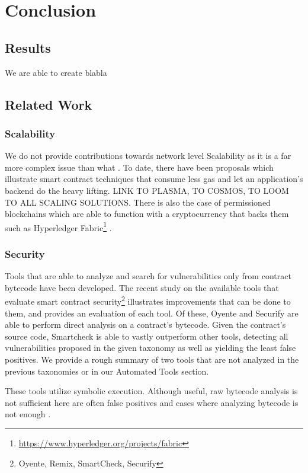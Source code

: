 \chapter{Conclusion}
\section{Results}
We are able to create blabla

\section{Related Work}

\subsection{Scalability}
We do not provide contributions towards network level Scalability as it is a far more complex issue than what . To date, there have been proposals \cite{stateless} which illustrate smart contract techniques that consume less gas and let an application's backend do the heavy lifting. LINK TO PLASMA, TO COSMOS, TO LOOM TO ALL SCALING SOLUTIONS. There is also the case of permissioned blockchains which are able to function with a cryptocurrency that backs them such as Hyperledger Fabric\footnote{\url{https://www.hyperledger.org/projects/fabric}} \cite{Vukolic:2017:RPB:3055518.3055526}.

\subsection{Security}
Tools that are able to analyze and search for vulnerabilities only from contract bytecode have been developed\cite{Luu:2016:MSC:2976749.2978309, greedyprodigal, mythril}. The recent study\cite{tools} on the available tools that evaluate smart contract security\footnote{Oyente, Remix, SmartCheck, Securify} illustrates improvements that can be done to them, and provides an evaluation of each tool. Of these, Oyente and Securify are able to perform direct analysis on a contract's bytecode. Given the contract's source code, Smartcheck is able to vastly outperform other tools, detecting all vulnerabilities proposed in the given taxonomy as well as yielding the least false positives. We provide a rough summary of two tools that are not analyzed in the previous taxonomies or in our Automated Tools section.

These tools utilize symbolic execution. Although useful, raw bytecode analysis is not sufficient here are often false positives and cases where analyzing bytecode is not enough \cite{zeus}. 

